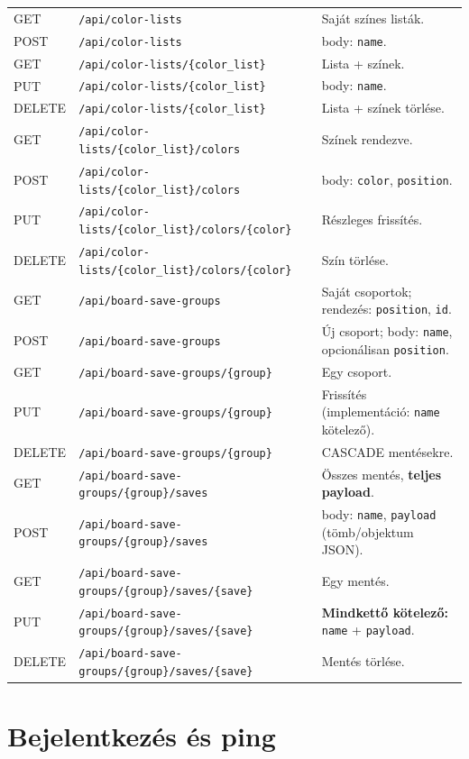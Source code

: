 {\begin{longtable}{@{}llp{6.8cm}@{}}
\midrule
GET & \texttt{/api/color-lists} & Saját színes listák. \\
POST & \texttt{/api/color-lists} & body: \texttt{name}. \\
GET & \texttt{/api/color-lists/\{color\_list\}} & Lista + színek. \\
PUT & \texttt{/api/color-lists/\{color\_list\}} & body: \texttt{name}. \\
DELETE & \texttt{/api/color-lists/\{color\_list\}} & Lista + színek törlése. \\
GET & \texttt{/api/color-lists/\{color\_list\}/colors} & Színek rendezve. \\
POST & \texttt{/api/color-lists/\{color\_list\}/colors} & body: \texttt{color}, \texttt{position}. \\
PUT & \texttt{/api/color-lists/\{color\_list\}/colors/\{color\}} & Részleges frissítés. \\
DELETE & \texttt{/api/color-lists/\{color\_list\}/colors/\{color\}} & Szín törlése. \\
\midrule
GET & \texttt{/api/board-save-groups} & Saját csoportok; rendezés: \texttt{position}, \texttt{id}. \\
POST & \texttt{/api/board-save-groups} & Új csoport; body: \texttt{name}, opcionálisan \texttt{position}. \\
GET & \texttt{/api/board-save-groups/\{group\}} & Egy csoport. \\
PUT & \texttt{/api/board-save-groups/\{group\}} & Frissítés (implementáció: \texttt{name} kötelező). \\
DELETE & \texttt{/api/board-save-groups/\{group\}} & CASCADE mentésekre. \\
GET & \texttt{/api/board-save-groups/\{group\}/saves} & Összes mentés, \textbf{teljes payload}. \\
POST & \texttt{/api/board-save-groups/\{group\}/saves} & body: \texttt{name}, \texttt{payload} (tömb/objektum JSON). \\
GET & \texttt{/api/board-save-groups/\{group\}/saves/\{save\}} & Egy mentés. \\
PUT & \texttt{/api/board-save-groups/\{group\}/saves/\{save\}} & \textbf{Mindkettő kötelező:} \texttt{name} + \texttt{payload}. \\
DELETE & \texttt{/api/board-save-groups/\{group\}/saves/\{save\}} & Mentés törlése. \\
\end{longtable}
}

\section{Bejelentkezés és ping}
